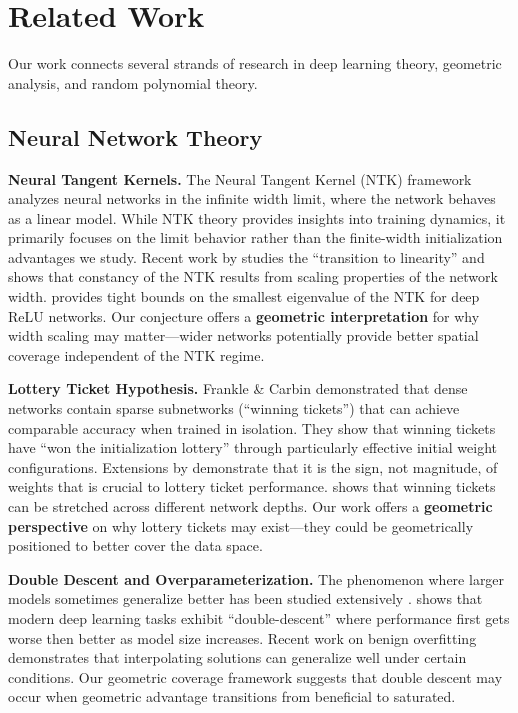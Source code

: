 \section{Related Work}
\label{sec:related_work}

Our work connects several strands of research in deep learning theory, geometric analysis, and random polynomial theory.

\subsection{Neural Network Theory}

\textbf{Neural Tangent Kernels.} The Neural Tangent Kernel (NTK) framework \cite{Jacot2018NeuralTK} analyzes neural networks in the infinite width limit, where the network behaves as a linear model. While NTK theory provides insights into training dynamics, it primarily focuses on the limit behavior rather than the finite-width initialization advantages we study. Recent work by \cite{Liu2020OnThe} studies the ``transition to linearity'' and shows that constancy of the NTK results from scaling properties of the network width. \cite{Nguyen2021TightBounds} provides tight bounds on the smallest eigenvalue of the NTK for deep ReLU networks. Our conjecture offers a \textbf{geometric interpretation} for why width scaling may matter---wider networks potentially provide better spatial coverage independent of the NTK regime.

\textbf{Lottery Ticket Hypothesis.} Frankle \& Carbin \cite{Frankle2018TheLT} demonstrated that dense networks contain sparse subnetworks (``winning tickets'') that can achieve comparable accuracy when trained in isolation. They show that winning tickets have ``won the initialization lottery'' through particularly effective initial weight configurations. Extensions by \cite{Zhou2019DeconstructingLT} demonstrate that it is the sign, not magnitude, of weights that is crucial to lottery ticket performance. \cite{Chen2021TheEL} shows that winning tickets can be stretched across different network depths. Our work offers a \textbf{geometric perspective} on why lottery tickets may exist---they could be geometrically positioned to better cover the data space.

\textbf{Double Descent and Overparameterization.} The phenomenon where larger models sometimes generalize better has been studied extensively \cite{Belkin2018ReconcilingMM}. \cite{Nakkiran2019DeepDD} shows that modern deep learning tasks exhibit ``double-descent'' where performance first gets worse then better as model size increases. Recent work on benign overfitting \cite{BartlettBenignOverfitting} demonstrates that interpolating solutions can generalize well under certain conditions. Our geometric coverage framework suggests that double descent may occur when geometric advantage transitions from beneficial to saturated.

